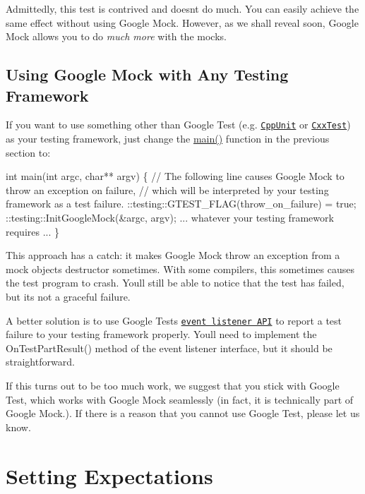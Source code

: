 Admittedly, this test is contrived and doesn\textquotesingle{}t do much. You can easily achieve the same effect without using Google Mock. However, as we shall reveal soon, Google Mock allows you to do {\itshape much more} with the mocks.

\subsection*{Using Google Mock with Any Testing Framework}

If you want to use something other than Google Test (e.\+g. \href{http://apps.sourceforge.net/mediawiki/cppunit/index.php?title=Main_Page}{\tt Cpp\+Unit} or \href{http://cxxtest.tigris.org/}{\tt Cxx\+Test}) as your testing framework, just change the {\ttfamily \hyperlink{odom__tracker__node_8cpp_a3c04138a5bfe5d72780bb7e82a18e627}{main()}} function in the previous section to\+: 
\begin{DoxyCode}
int main(int argc, char** argv) \{
  // The following line causes Google Mock to throw an exception on failure,
  // which will be interpreted by your testing framework as a test failure.
  ::testing::GTEST\_FLAG(throw\_on\_failure) = true;
  ::testing::InitGoogleMock(&argc, argv);
  ... whatever your testing framework requires ...
\}
\end{DoxyCode}


This approach has a catch\+: it makes Google Mock throw an exception from a mock object\textquotesingle{}s destructor sometimes. With some compilers, this sometimes causes the test program to crash. You\textquotesingle{}ll still be able to notice that the test has failed, but it\textquotesingle{}s not a graceful failure.

A better solution is to use Google Test\textquotesingle{}s \href{http://code.google.com/p/googletest/wiki/GoogleTestAdvancedGuide#Extending_Google_Test_by_Handling_Test_Events}{\tt event listener A\+PI} to report a test failure to your testing framework properly. You\textquotesingle{}ll need to implement the {\ttfamily On\+Test\+Part\+Result()} method of the event listener interface, but it should be straightforward.

If this turns out to be too much work, we suggest that you stick with Google Test, which works with Google Mock seamlessly (in fact, it is technically part of Google Mock.). If there is a reason that you cannot use Google Test, please let us know.

\section*{Setting Expectations}

